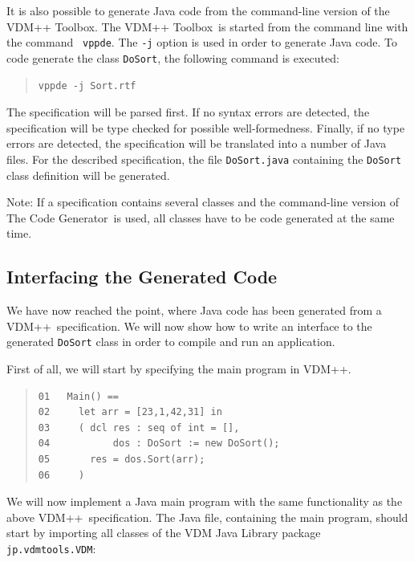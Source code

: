 \documentclass[\pformat,11pt]{article}
\newcommand{\ToolboxName}{VDM++ Toolbox}
\newcommand{\vdmde}{vppde}
\newcommand{\Tcg}{The Code Generator}
\newcommand{\VDM}{VDM++}
\newcommand{\JL}{VDM Java Library}
\begin{document}
It is also possible to generate Java code from the command-line
version of the \ToolboxName. The \ToolboxName\ is started from the
command line with the command {\tt
\vdmde}. The {\tt -j} option is used in order to
generate Java code. To code generate the class {\tt DoSort},
the following command is executed:

\begin{quote}
\begin{verbatim}
vppde -j Sort.rtf
\end{verbatim}
\end{quote}

The specification will be parsed first. If no syntax errors are
detected, the specification will be type checked for possible
well-formedness. Finally, if no type errors are detected, the
specification will be translated into a number of Java files.  For the
described specification, the file {\tt DoSort.java} containing the
{\tt DoSort} class definition will be generated.

Note: If a specification contains several classes and the command-line
version of \Tcg\ is used, all classes have to be code generated at the
same time.


\subsection{Interfacing the Generated Code}\label{interfacinggettingstarted}

We have now reached the point, where Java code has been generated from
a \VDM\ specification.  We will now show how to write an interface to
the generated {\tt DoSort} class in order to compile and run an
application.

\newpage
First of all, we will start by specifying the main program in \VDM{}.

\begin{quote}
\begin{verbatim}
01   Main() ==
02     let arr = [23,1,42,31] in  
03     ( dcl res : seq of int = [],
04           dos : DoSort := new DoSort();
05       res = dos.Sort(arr);
06     )
\end{verbatim}
\end{quote}

We will now implement a Java main program with the same functionality
as the above \VDM\ specification. 
The Java file, containing the main program, should start by 
importing all classes of the \JL{} package {\tt jp.vdmtools.VDM}:
\end{document}
